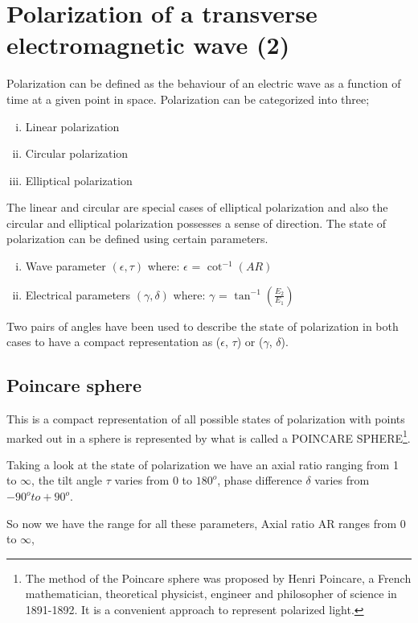 \chapter{Polarization of a transverse electromagnetic wave (2)}\label{lec:lec24}
Polarization can be defined as the behaviour of an electric wave as a function of time at a given point in space. Polarization can be categorized into three; 
\begin{enumerate}[(i)]
\item Linear polarization
\item Circular polarization
\item Elliptical polarization
\end{enumerate}
The linear and circular are special cases of elliptical polarization and also the circular and elliptical polarization possesses a sense of direction. The state of polarization can be defined using certain parameters.
\begin{enumerate}[(i)]
\item Wave parameter $(\epsilon,\tau)$
\newline where: $\epsilon$ = $\cot^{-1}(AR)$
\item Electrical parameters $(\gamma, \delta)$
\newline	where: $\gamma$ = $\tan^{-1} (\frac{E_{2}}{E_{1}})$
\end{enumerate}
Two pairs of angles have been used to describe the state of polarization in both cases to have a compact representation as ($\epsilon$, $\tau$)  or ($\gamma$, $\delta$).

\section{Poincare sphere}
This is a compact representation of all possible states of polarization with points marked out in a sphere is represented by what is called a POINCARE SPHERE\footnote{The method of the Poincare sphere was proposed by Henri Poincare, a French mathematician, theoretical physicist, engineer and philosopher of science in 1891-1892. It is a convenient approach to represent polarized light.}.

Taking a look at the state of polarization we have an axial ratio ranging from 1 to $\infty$, the tilt angle $\tau$ varies from 0 to $180^{o}$, phase difference $\delta$ varies from $-90^{o} to +90^{o}$.

So now we have the range for all these parameters, Axial ratio AR ranges from 0 to $\infty$, 


